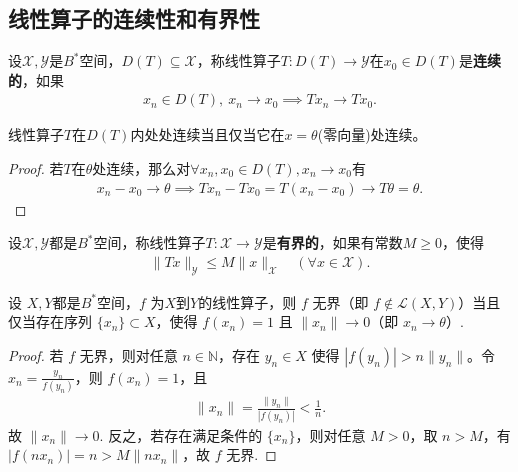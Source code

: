 \documentclass[../../main.tex]{subfiles}%
\begin{document}
\subsection{线性算子的连续性和有界性}

\begin{definition}
设$\mathscr{X},\mathscr{Y}$是$B^*$空间，$D(T)\subseteq\mathscr{X}$，称线性算子$T:D(T)\to\mathscr{Y}$在$x_0\in D(T)$是\textbf{连续的}，如果
\begin{align*}
x_n\in D(T),\ x_n\to x_0\implies Tx_n\to Tx_0.
\end{align*}
\end{definition}

\begin{proposition}\label{proposition:线性算子在零元处连续等价于全空间连续}
线性算子$T$在$D(T)$内处处连续当且仅当它在$x=\theta$(零向量)处连续。
\end{proposition}
\begin{proof}
若$T$在$\theta$处连续，那么对$\forall x_n,x_0\in D(T),x_n\to x_0$有
\begin{align*}
x_n-x_0\to\theta\implies Tx_n-Tx_0=T(x_n-x_0)\to T\theta=\theta.
\end{align*}
\end{proof}

\begin{definition}
设$\mathscr{X},\mathscr{Y}$都是$B^*$空间，称线性算子$T:\mathscr{X}\to\mathscr{Y}$是\textbf{有界的}，如果有常数$M\geqslant 0$，使得
\begin{align*}
\|Tx\|_{\mathscr{Y}}\leqslant M\|x\|_{\mathscr{X}}\quad (\forall x\in\mathscr{X}).
\end{align*}
\end{definition}

\begin{proposition}\label{proposition:线性算子无界充要条件}
设 \(X,Y\)都是$B^*$空间，\(f\) 为$X$到$Y$的线性算子，则 \(f\) 无界（即 \(f \notin \mathscr{L}(X,Y)\)）当且仅当存在序列 \(\{x_n\} \subset X\)，使得 \(f(x_n) = 1\) 且 \(\|x_n\| \to 0\)（即 \(x_n \to \theta\)）.
\end{proposition}
\begin{proof}
若 \(f\) 无界，则对任意 \(n \in \mathbb{N}\)，存在 \(y_n \in X\) 使得 \(|f(y_n)| > n \|y_n\|\)。令 \(x_n = \frac{y_n}{f(y_n)}\)，则 \(f(x_n) = 1\)，且
\begin{align*}
\|x_n\| = \frac{\|y_n\|}{|f(y_n)|} < \frac{1}{n}.
\end{align*}
故 \(\|x_n\| \to 0\). 反之，若存在满足条件的 \(\{x_n\}\)，则对任意 \(M > 0\)，取 \(n > M\)，有 \(|f(n x_n)| = n > M \|n x_n\|\)，故 \(f\) 无界.
\end{proof}
\end{document}
